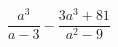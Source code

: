 \begin{ex}[type=expression]
	\begin{condition}
		\( \dfrac{a^3}{a-3}-\dfrac{3a^3+81}{a^2-9} \)
	\end{condition}
\end{ex}